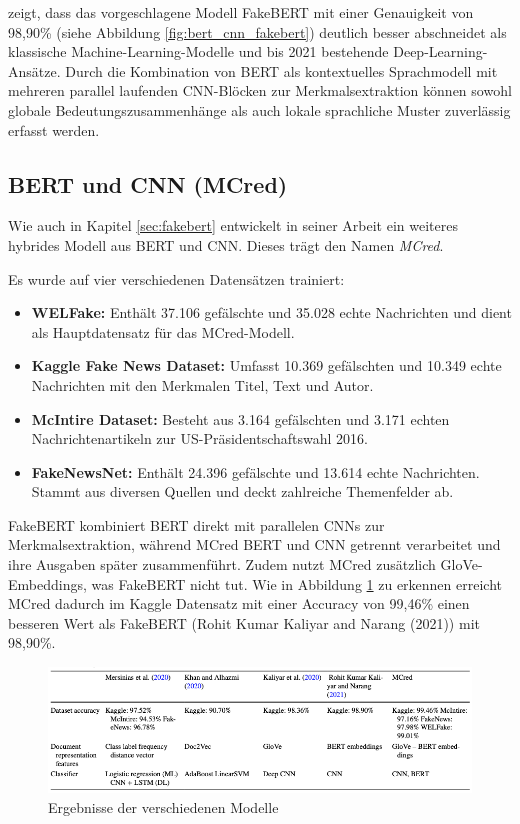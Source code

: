 \cite{Kaliyar:2021aa} zeigt, dass das vorgeschlagene Modell FakeBERT mit einer Genauigkeit von 98,90\% (siehe Abbildung \ref{fig:bert_cnn_fakebert})
deutlich besser abschneidet als klassische Machine-Learning-Modelle und bis 2021 bestehende Deep-Learning-Ansätze. Durch die Kombination von BERT als 
kontextuelles Sprachmodell mit mehreren parallel laufenden CNN-Blöcken zur Merkmalsextraktion können sowohl globale Bedeutungszusammenhänge als auch 
lokale sprachliche Muster zuverlässig erfasst werden.

\subsection{BERT und CNN (MCred)}

Wie auch in Kapitel \ref{sec:fakebert} entwickelt \cite{Verma:2023aa} in seiner Arbeit ein weiteres hybrides Modell aus BERT und CNN.
Dieses trägt den Namen \textit{MCred}.

Es wurde auf vier verschiedenen Datensätzen trainiert:
\begin{itemize}
  \item \textbf{WELFake:} Enthält 37.106 gefälschte und 35.028 echte Nachrichten und dient als Hauptdatensatz für das MCred-Modell.
  \item \textbf{Kaggle Fake News Dataset:} Umfasst 10.369 gefälschten und 10.349 echte Nachrichten mit den Merkmalen Titel, Text und Autor. 
  \item \textbf{McIntire Dataset:} Besteht aus 3.164 gefälschten und 3.171 echten Nachrichtenartikeln zur US-Präsidentschaftswahl 2016.
  \item \textbf{FakeNewsNet:} Enthält 24.396 gefälschte und 13.614 echte Nachrichten. Stammt aus diversen Quellen und deckt zahlreiche Themenfelder ab.
\end{itemize}

FakeBERT kombiniert BERT direkt mit parallelen CNNs zur Merkmalsextraktion, während MCred BERT und CNN getrennt verarbeitet und 
ihre Ausgaben später zusammenführt. Zudem nutzt MCred zusätzlich GloVe-Embeddings, was FakeBERT nicht tut. 
Wie in Abbildung \ref{fig:bert_cnn_mcred} zu erkennen erreicht MCred dadurch im Kaggle Datensatz mit einer Accuracy von 99,46\% 
einen besseren Wert als FakeBERT (Rohit Kumar Kaliyar and Narang (2021)) mit 98,90\%.

\begin{figure}[htbp]
    \begin{center}
    \includegraphics[width=\linewidth]{static/bert_cnn_mcred.png}
    \caption{\label{fig:bert_cnn_mcred} Ergebnisse der verschiedenen Modelle \cite{Verma:2023aa}}
    \end{center}
\end{figure}

